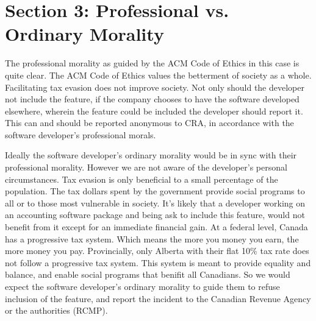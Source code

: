 \section{Section 3: Professional vs. Ordinary Morality}


The professional morality as guided by the ACM Code of Ethics in this case is quite clear. The ACM Code of Ethics values the betterment of society as a whole. Facilitating tax evasion does not improve society. Not only should the developer not include the feature, if the company chooses to have the software developed elsewhere, wherein the feature could be included the developer should report it. This can and should be reported anonymous to CRA, in accordance with the software developer’s professional morals. 


Ideally the software developer's ordinary morality would be in sync with their professional morality. However we are not aware of the developer's personal circumstances. Tax evasion is only beneficial to a small percentage of the population. The tax dollars spent by the government provide social programs to all or to those most vulnerable in society. It's likely that a developer working on an accounting software package and being ask to include this feature, would not benefit from it except for an immediate financial gain. At a federal level, Canada has a progressive tax system. Which means the more you money you earn, the more money you pay. Provincially, only Alberta with their flat 10\% tax rate does not follow a progressive tax system. This system is meant to provide equality and balance, and enable social programs that benifit all Canadians. So we would expect the software developer’s ordinary morality to guide them to refuse inclusion of the feature, and report the incident to the Canadian Revenue Agency or the authorities (RCMP).

